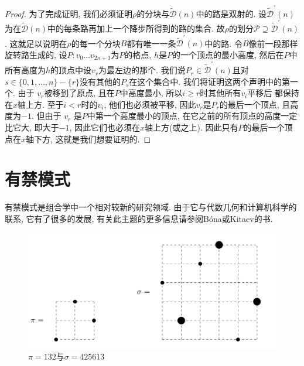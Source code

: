 \documentclass{ctexbook}
\begin{document}
\begin{proof}
    	为了完成证明, 我们必须证明$\rho$的分块与$\tilde{\mathcal{D}}(n)$中的路是双射的. 设$\tilde{\mathcal{D}}^{\prime}(n)$
    	为在$\tilde{\mathcal{D}}(n)$中的每条路再加上一个降步所得到的路的集合. 故$\rho$的划分$\mathcal{P} \supseteq \tilde{\mathcal{D}}^{\prime}(n)$.
    	这就足以说明在$\rho$的每一个分块$B$都有唯一一条$\tilde{\mathcal{D}}^{\prime}(n)$中的路. 令$B$像前一段那样旋转路生成的,
    	设$P: v_{0} \ldots v_{2 n+1}$为$P$的格点, $h$是$P$的一个顶点的最小高度, 然后在$P$中所有高度为$h$的顶点中设$v_{r}$为最左边的那个.
    	我们说$P_{r} \in \tilde{\mathcal{D}}^{\prime}(n)$且对$s \in\{0,1, \ldots, n\}-\{r\}$没有其他的$P_{s}$在这个集合中.
    	我们将证明这两个声明中的第一个. 由于 $v_{r}$被移到了原点, 且在$P$中高度最小, 所以$i \geqslant r$时其他所有$v_{i}$平移后
    	都保持在$x$轴上方. 至于$i<r$时的$v_{i}$, 他们也必须被平移, 因此$v_{r}$是$P_{r}$的最后一个顶点, 且高度为$-1 $. 但由于
    	$v_{r}$ 是$P$中第一个高度最小的顶点, 在它之前的所有顶点的高度一定比它大, 即大于$-1$, 因此它们也必须在$x$轴上方(或之上).
    	因此只有$P$的最后一个顶点在$x$轴下方, 这就是我们想要证明的.
    \end{proof}

\section{有禁模式}
有禁模式是组合学中一个相对较新的研究领域. 由于它与代数几何和计算机科学的联系, 它有了很多的发展, 有关此主题的更多信息请参阅Bóna或Kitaev的书.

\begin{figure}
    \centering
    \includegraphics[scale=0.3]{./fig1/figure1.12.PNG}
    \caption{$\pi=132$与$\sigma=425613$}
\end{figure}
\end{document}
